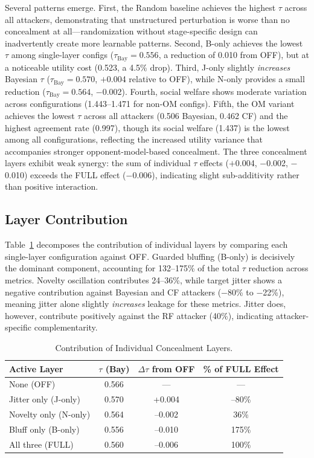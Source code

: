 \documentclass[runningheads]{llncs}
\begin{document}
Several patterns emerge.
First, the Random baseline achieves the highest $\tau$ across all attackers, demonstrating that unstructured perturbation is worse than no concealment at all---randomization without stage-specific design can inadvertently create more learnable patterns. Second, B-only achieves the lowest $\tau$ among single-layer configs ($\tau_{\text{Bay}} = 0.556$, a reduction of 0.010 from OFF), but at a noticeable utility cost (0.523, a 4.5\% drop). Third, J-only slightly \emph{increases} Bayesian $\tau$ ($\tau_{\text{Bay}} = 0.570$, $+$0.004 relative to OFF), while N-only provides a small reduction ($\tau_{\text{Bay}} = 0.564$, $-$0.002). Fourth, social welfare shows moderate variation across configurations (1.443--1.471 for non-OM configs). Fifth, the OM variant achieves the lowest $\tau$ across all attackers (0.506 Bayesian, 0.462 CF) and the highest agreement rate (0.997), though its social welfare (1.437) is the lowest among all configurations, reflecting the increased utility variance that accompanies stronger opponent-model-based concealment. The three concealment layers exhibit weak synergy: the sum of individual $\tau$ effects ($+$0.004, $-$0.002, $-$0.010) exceeds the FULL effect ($-$0.006), indicating slight sub-additivity rather than positive interaction.

\subsection{Layer Contribution}

Table~\ref{tab:layercontrib} decomposes the contribution of individual layers
by comparing each single-layer configuration against OFF. Guarded bluffing (B-only) is decisively the dominant component, accounting for 132--175\% of the total $\tau$ reduction across metrics. Novelty oscillation contributes 24--36\%, while target jitter shows a negative contribution against Bayesian and CF attackers ($-$80\% to $-$22\%), meaning jitter alone slightly \emph{increases} leakage for these metrics. Jitter does, however, contribute positively against the RF attacker (40\%), indicating attacker-specific complementarity.

\begin{table}[t]
\centering
\caption{Contribution of Individual Concealment Layers.}
\label{tab:layercontrib}
\small
\renewcommand{\arraystretch}{1.15}
\begin{tabular}{lccc}
\toprule
\textbf{Active Layer} & $\tau$ \textbf{(Bay)} & $\Delta\tau$ \textbf{from OFF} & \textbf{\% of FULL Effect} \\
\midrule
None (OFF)     & 0.566 & --- & --- \\
Jitter only (J-only)   & 0.570 & +0.004 & --80\% \\
Novelty only (N-only)  & 0.564 & --0.002 & 36\% \\
Bluff only (B-only)    & 0.556 & --0.010 & 175\% \\
All three (FULL)       & 0.560 & --0.006 & 100\% \\
\bottomrule
\end{tabular}
\end{table}
\end{document}
